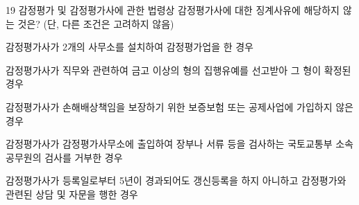 \begin{question}{19}
감정평가 및 감정평가사에 관한 법령상 감정평가사에 대한 징계사유에 해당하지 않는 것은? (단, 다른 조건은 고려하지 않음)
\begin{choices}
  \item 감정평가사가 2개의 사무소를 설치하여 감정평가업을 한 경우
  \item 감정평가사가 직무와 관련하여 금고 이상의 형의 집행유예를 선고받아 그 형이 확정된 경우
  \item 감정평가사가 손해배상책임을 보장하기 위한 보증보험 또는 공제사업에 가입하지 않은 경우
  \item 감정평가사가 감정평가사무소에 출입하여 장부나 서류 등을 검사하는 국토교통부 소속 공무원의 검사를 거부한 경우
  \item 감정평가사가 등록일로부터 5년이 경과되어도 갱신등록을 하지 아니하고 감정평가와 관련된 상담 및 자문을 행한 경우
\end{choices}
\end{question}
